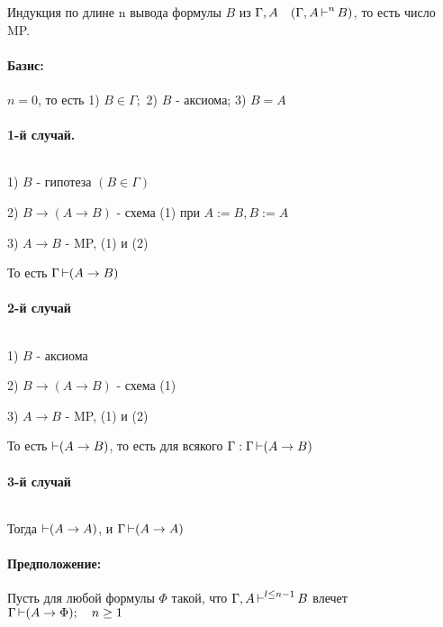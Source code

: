 

\title{}
\author{Козырнов Александр Дмитриевич, ИУ7-32Б}
\date{\today}



\begin{myproof}
Индукция по длине n вывода формулы  $B$ из  $\Gamma, A\quad (\Gamma, A \operatorname{\vdash}^{n} B)$, то есть
число MP.

\medskip

\paragraph*{Базис:} $n = 0$, то есть 1) $B \in \Gamma;$ 2) $B$ - аксиома; 3)  $B=A$

\medskip

\paragraph*{1-й случай.} ${}$ \newline


1) $B$ - гипотеза  $(B \in \Gamma)$

2) $B \to (A \to B)$ - схема (1) при $A:=B, B := A$

3)  $A \to B$ - MP, (1) и (2)

То есть $\Gamma \operatorname{\vdash} (A \to B)$
 
\paragraph*{2-й случай} ${}$ \newline

1) $B$ - аксиома

2) $B \to (A \to B)$ - схема (1)

3) $A \to B$ - MP, (1) и (2)

То есть $\operatorname{\vdash} (A \to B)$, то есть для всякого $\Gamma: \Gamma \operatorname{\vdash} (A \to B)$

\paragraph*{3-й случай} ${}$ \newline

Тогда $\operatorname{\vdash} (A \to A)$, и $\Gamma \operatorname{\vdash} (A \to A)$

\paragraph*{Предположение:} Пусть для любой формулы $\Phi$ такой, что  $\Gamma,A\operatorname{\vdash}^{l\le n-1}B$ 
влечет $\Gamma \operatorname{\vdash} (A \to \Phi); \quad n \ge 1$


\end{myproof}
